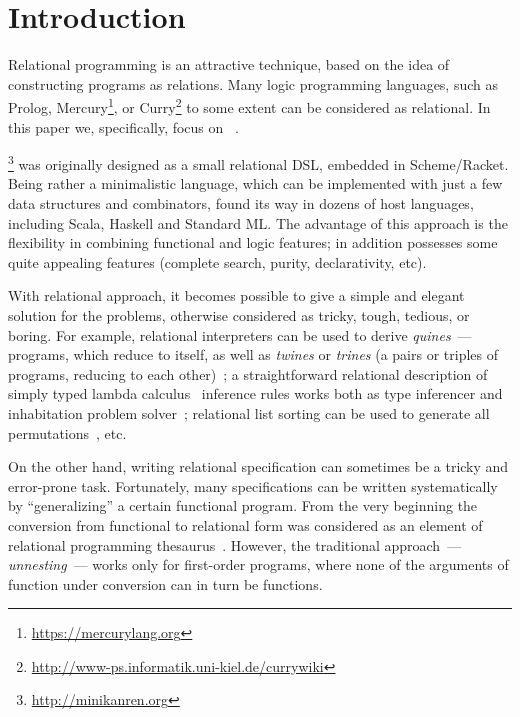 \section{Introduction}
\label{intro}

Relational programming is an attractive technique, based on the idea of constructing programs as relations.
Many logic programming languages, such as Prolog, Mercury\footnote{\url{https://mercurylang.org}}, 
or Curry\footnote{\url{http://www-ps.informatik.uni-kiel.de/currywiki}} to some extent can be considered as relational. 
In this paper we, specifically, focus on \miniKanren~\cite{TRS}. 

\miniKanren\footnote{\url{http://minikanren.org}} was originally designed as a small relational DSL, embedded in Scheme/Racket. 
Being rather a minimalistic language, which can be implemented with just a few data structures and combinators, \miniKanren found 
its way in dozens of host languages, including Scala, Haskell and Standard ML. The advantage of this approach is the flexibility in
combining functional and logic features; in addition \miniKanren possesses some quite appealing features (complete search, purity, 
declarativity, etc).

With relational approach, it becomes possible to give a simple and elegant solution for the problems, otherwise
considered as tricky, tough, tedious, or boring. For example, relational interpreters can be used to derive
\emph{quines}~--- programs, which reduce to itself, as well as \emph{twines} or \emph{trines} (a pairs or triples of
programs, reducing to each other)~\cite{Untagged}; a straightforward relational description of
simply typed lambda calculus~\cite{Lambda} inference rules works both as type inferencer and inhabitation problem solver~\cite{WillThesis};
relational list sorting can be used to generate all permutations~\cite{ocanren}, etc. 

On the other hand, writing relational specification can sometimes be a tricky and error-prone task. Fortunately, many 
specifications can be written systematically by ``generalizing'' a certain functional program. From the very beginning 
the conversion from functional to relational form was considered as an element of relational programming thesaurus~\cite{TRS}. However,
the traditional approach~--- \emph{unnesting}~--- works only for first-order programs, where none of the arguments of
function under conversion can in turn be functions.

